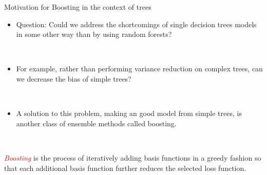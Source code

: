 \documentclass[
  10pt,
  ignorenonframetext,
]{beamer}
\providecommand{\tightlist}{%
  \setlength{\itemsep}{0pt}\setlength{\parskip}{0pt}}
\begin{document}
\begin{frame}
\begin{block}{Motivation for Boosting in the context of trees}
\protect\hypertarget{motivation-for-boosting-in-the-context-of-trees}{}
\(~\)

\begin{itemize}
\tightlist
\item
  Question: Could we address the shortcomings of single decision trees
  models in some other way than by using random forests?
\end{itemize}

\(~\)

\begin{itemize}
\tightlist
\item
  For example, rather than performing variance reduction on complex
  trees, can we decrease the bias of simple trees?
\end{itemize}

\(~\)

\begin{itemize}
\tightlist
\item
  A solution to this problem, making an good model from simple trees, is
  another class of ensemble methods called boosting.
\end{itemize}

\(~\)

\emph{\textcolor{red}{Boosting}} is the process of iteratively adding
basis functions in a greedy fashion so that each additional basis
function further reduces the selected loss function.
\end{block}
\end{frame}
\end{document}
